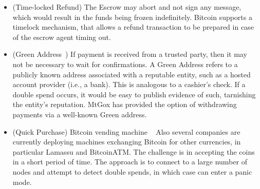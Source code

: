 \begin{itemize}
\item (Time-locked Refund) The Escrow may abort and not sign any message, which would result in the funds being frozen indefinitely. Bitcoin supports a timelock mechanism, that allows a refund transaction to be prepared in case of the escrow agent timing out.
\item (Green Address~\cite{greenaddress}) If payment is received from a trusted party, then it may not be necessary to wait for confirmations. A Green Address refers to a publicly known address associated with a reputable entity, such as a hosted account provider (i.e., a bank). This is analogous to a cashier's check. If a double spend occurs, it would be easy to publish evidence of such, tarnishing the entity's reputation. MtGox has provided the option of withdrawing payments via a well-known Green address.

\item (Quick Purchase) Bitcoin vending machine ~\cite{bitcoinsnack} Also several companies are currently deploying machines exchanging Bitcoin for other currencies, in particular Lamassu and BitcoinATM. The challenge is in accepting the coins in a short period of time. The approach is to connect to a large number of nodes and attempt to detect double spends, in which case can enter a panic mode.


\end{itemize}
